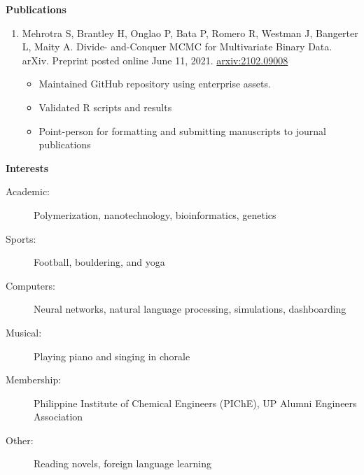 \documentclass[letterpaper,11pt]{article}
\newcommand{\resitem}[1]{\item #1 \vspace{-2pt}}
\newcommand{\resheading}[1]{{\large \colorbox{mygrey}{\begin{minipage}{\textwidth}{\textbf{#1 \vphantom{p\^{E}}}}\end{minipage}}}}
\begin{document}
\resheading{Publications}

\begin{enumerate}
    \item Mehrotra S, Brantley H, Onglao P, Bata P, Romero R, Westman J, Bangerter L, Maity A. Divide- and-Conquer MCMC for Multivariate Binary Data. arXiv. Preprint posted online June 11, 2021. \href{https://arxiv.org/pdf/2102.09008.pdf}{arxiv:2102.09008} 
    \vspace{-5pt}
    \begin{itemize}
        \item Maintained GitHub repository using enterprise assets.
        \item Validated R scripts and results
        \item Point-person for formatting and submitting manuscripts to journal publications 
    \end{itemize}
\end{enumerate}
    




\resheading{Interests}

\begin{description}
\item[Academic:] Polymerization, nanotechnology, bioinformatics, genetics
\item[Sports:] Football, bouldering, and yoga
\item[Computers:] Neural networks, natural language processing, simulations, dashboarding
\item[Musical:] Playing piano and singing in chorale
\item[Membership:] Philippine Institute of Chemical Engineers (PIChE), UP Alumni Engineers Association
\item[Other:] Reading novels, foreign language learning
\end{description}

\end{document}
